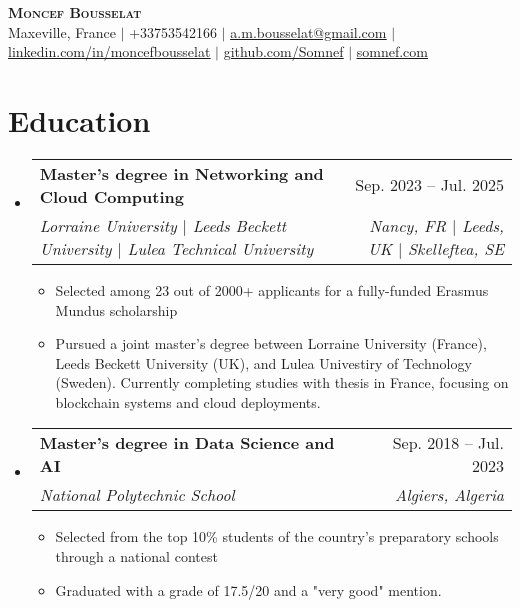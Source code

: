 \documentclass[letterpaper,10.5t]{article}
\makeatletter
\newcommand{\resumeItem}[1]{
  \item\small{
    {#1 \vspace{-2pt}}
  }
}
\newcommand{\resumeSubheading}[4]{
  \vspace{-2pt}\item
    \begin{tabular*}{0.97\textwidth}[t]{l@{\extracolsep{\fill}}r}
      \textbf{#1} & #2 \\
      \textit{\small#3} & \textit{\small #4} \\
    \end{tabular*}\vspace{-7pt}
}
\newcommand{\resumeSubHeadingListStart}{\begin{itemize}[leftmargin=0.15in, label={}]}
\newcommand{\resumeSubHeadingListEnd}{\end{itemize}}
\newcommand{\resumeItemListStart}{\begin{itemize}}
\newcommand{\resumeItemListEnd}{\end{itemize}\vspace{-5pt}}
\makeatother
\begin{document}

\begin{center}
    \textbf{\Huge \scshape Moncef Bousselat} \\ \vspace{1pt}
    \small Maxeville, France $|$ 
    \small +33753542166 $|$ 
    \href{mailto:a.m.bousselat@gmail.com@gmail.com}{\underline{a.m.bousselat@gmail.com}} $|$ 
    \href{https://www.linkedin.com/in/moncefbousselat/}{\underline{linkedin.com/in/moncefbousselat}} $|$
    \href{https://github.com/Somnef}{\underline{github.com/Somnef}} $|$
    \href{https://www.somnef.com}{\underline{somnef.com}}
\end{center}


\section{Education}
    \resumeSubHeadingListStart
        \resumeSubheading
        {Master's degree in Networking and Cloud Computing}{Sep. 2023 -- Jul. 2025}
        {Lorraine University $|$ Leeds Beckett University $|$ Lulea Technical University}{Nancy, FR $|$ Leeds, UK $|$ Skelleftea, SE}
            \resumeItemListStart
                \resumeItem{Selected among 23 out of 2000+ applicants for a fully-funded Erasmus Mundus scholarship}
                \resumeItem{Pursued a joint master's degree between Lorraine University (France), Leeds Beckett University (UK), and Lulea Univestiry of Technology (Sweden). Currently completing studies with thesis in France, focusing on blockchain systems and cloud deployments.}
            \resumeItemListEnd
      
        \resumeSubheading
        {Master's degree in Data Science and AI}{Sep. 2018 -- Jul. 2023}
        {National Polytechnic School}{Algiers, Algeria}
            \resumeItemListStart
                \resumeItem{Selected from the top 10\% students of the country's preparatory schools through a national contest}
                \resumeItem{Graduated with a grade of 17.5/20 and a "very good" mention.}
            \resumeItemListEnd
  \resumeSubHeadingListEnd
\end{document}
